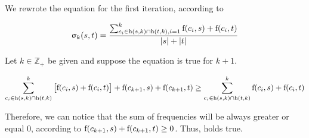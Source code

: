 
We rewrote the equation for the first iteration, according to 

\begin{equation} \label{eq:m2}
	\upsigma_{k}(s,t)=\frac
	{\sum_{c_i \in \textnormal{h}(s,k) \cap \textnormal{h}(t,k), i=1}^k \textnormal{f}(c_i,s)+\textnormal{f}(c_i,t)}
	{|s|+|t|}
\end{equation}

Let $k \in \mathbb{Z}_+$ be given and suppose the equation  is true for $k+1$. %



\begin{equation} \label{eq:k3}
	\begin{split}
	\sum_{c_i \in \textnormal{h}(s,k) \cap \textnormal{h}(t,k)}^{k} \begin{bmatrix} \textnormal{f}(c_i,s)+\textnormal{f}(c_i,t)\end{bmatrix} + \textnormal{f}(c_{k+1},s)+\textnormal{f}(c_{k+1},t)
	\geq \sum_{c_i \in \textnormal{h}(s,k) \cap \textnormal{h}(t,k)}^k \textnormal{f}(c_i,s)+\textnormal{f}(c_i,t)
	\end{split}
\end{equation}

Therefore, we can notice that the sum of frequencies will be always greater or equal 0, according to $\textnormal{f}(c_{k+1},s)+\textnormal{f}(c_{k+1},t) \geq 0$. Thus,  holds true.


